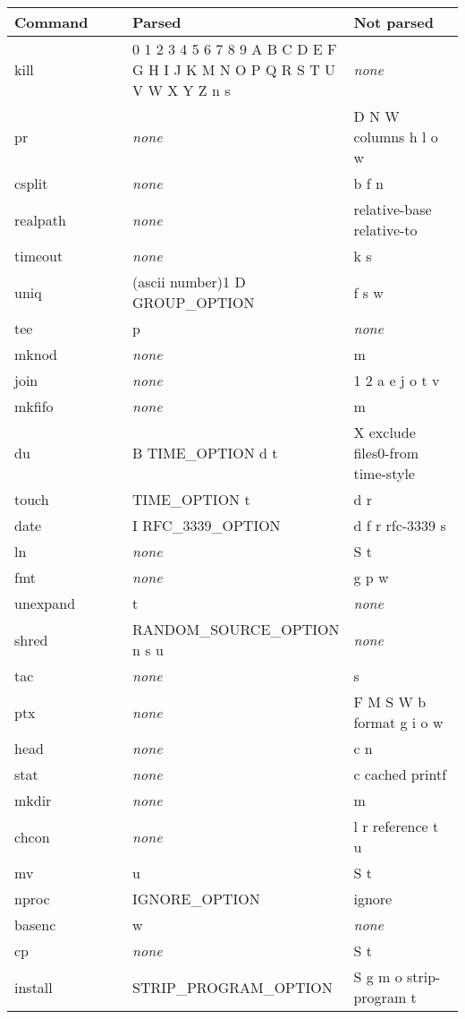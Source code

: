 \begin{longtable}{|p{0.3\linewidth}|p{0.4\linewidth}|p{0.3\linewidth}|}
\hline
Command& Parsed& Not parsed\\
\hline
\hline
kill & 0 1 2 3 4 5 6 7 8 9 A B C D E F G H I J K M N O P Q R S T U V W X Y Z n s &  \textit{none}\\ 
\hline
pr &  \textit{none} &D N W columns h l o w\\ 
\hline
csplit &  \textit{none} &b f n\\ 
\hline
realpath &  \textit{none} &relative-base relative-to\\ 
\hline
timeout &  \textit{none} &k s\\ 
\hline
uniq & (ascii number)1 D GROUP\_OPTION & f s w\\ 
\hline
tee & p &  \textit{none}\\ 
\hline
mknod &  \textit{none} &m\\ 
\hline
join &  \textit{none} &1 2 a e j o t v\\ 
\hline
mkfifo &  \textit{none} &m\\ 
\hline
du & B TIME\_OPTION d t & X exclude files0-from time-style\\ 
\hline
touch & TIME\_OPTION t & d r\\ 
\hline
date & I RFC\_3339\_OPTION & d f r rfc-3339 s\\ 
\hline
ln &  \textit{none} &S t\\ 
\hline
fmt &  \textit{none} &g p w\\ 
\hline
unexpand & t &  \textit{none}\\ 
\hline
shred & RANDOM\_SOURCE\_OPTION n s u &  \textit{none}\\ 
\hline
tac &  \textit{none} &s\\ 
\hline
ptx &  \textit{none} &F M S W b format g i o w\\ 
\hline
head &  \textit{none} &c n\\ 
\hline
stat &  \textit{none} &c cached printf\\ 
\hline
mkdir &  \textit{none} &m\\ 
\hline
chcon &  \textit{none} &l r reference t u\\ 
\hline
mv & u & S t\\ 
\hline
nproc & IGNORE\_OPTION & ignore\\ 
\hline
basenc & w &  \textit{none}\\ 
\hline
cp &  \textit{none} &S t\\ 
\hline
install & STRIP\_PROGRAM\_OPTION & S g m o strip-program t\\ 

\end{longtable}
